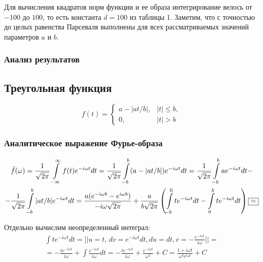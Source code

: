 \documentclass[a5paper, 10pt]{article}
\theoremstyle{definition}
\theoremstyle{plain}
\theoremstyle{remark}
\begin{document}
Для вычисления квадратов норм функции и ее образа интегрирование велось от $-100$ до $100$, то есть константа $d=100$ из таблицы 1. Заметим, что с точностью до целых равенства Парсеваля выполнены для всех рассматриваемых значений параметров $a$ и $b$.

\subsubsection{Анализ результатов}








\newpage
\subsection{Треугольная функция}

\begin{equation}
f(t) =
\begin{cases}
a - |at / b|, & |t| \leq b,\\
0, & |t| > b
\end{cases}
\end{equation}


\subsubsection{Аналитическое выражение Фурье-образа}

\begin{multline*}
\hat{f}(\omega) = \frac{1}{\sqrt{2 \pi}} \int \limits_{-\infty}^{\infty} f(t) e^{-i \omega t} dt =
 \frac{1}{\sqrt{2 \pi}} \int \limits_{-b}^{b} (a - |at / b|) e^{-i \omega t} dt =  \frac{1}{\sqrt{2 \pi}} \int \limits_{-b}^{b} a e^{-i \omega t} dt  -\\
- \frac{1}{\sqrt{2 \pi}} \int \limits_{-b}^{b}  |at / b| e^{-i \omega t} dt =   \frac{a ( e^{-i \omega b} -  e^{i \omega b})}{-i\omega \sqrt{2 \pi}} 
+ \frac{a}{b\sqrt{2 \pi}} \left( \int \limits_{-b}^{0}  t e^{-i \omega t} dt -  \int \limits_{0}^{b}  t e^{-i \omega t} dt  \right) \fbox{=}
\end{multline*}

Отдельно вычислим неопределенный интеграл:
\begin{multline}
\int  t e^{-i \omega t} dt = \left|  \right| u = t, \, dv =  e^{-i \omega t} dt, du=dt, v = -\frac{e^{-i \omega t}}{i \omega}\left|  \right| =\\
=  -\frac{t e^{-i \omega t}}{i \omega} + \int \frac{e^{-i \omega t}}{i \omega} dt =  -\frac{t e^{-i \omega t}}{i \omega} + \frac{e^{-i \omega t}}{ \omega^2} + C = \frac{1 + i \omega t}{\omega^2 e^{i \omega t}} + C
\end{multline} 
\end{document}
